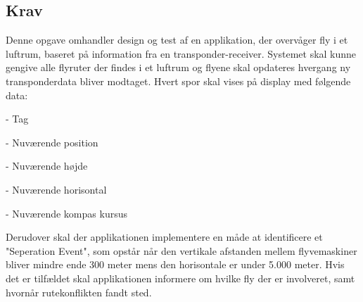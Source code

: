 \subsection{Krav}
Denne opgave omhandler design og test af en applikation, der overvåger fly i et luftrum, baseret på information fra en transponder-receiver. 
Systemet skal kunne gengive alle flyruter der findes i et luftrum og flyene skal opdateres hvergang ny transponderdata bliver modtaget. Hvert spor skal vises på display med følgende data: 

- Tag

- Nuværende position

- Nuværende højde

- Nuværende horisontal

- Nuværende kompas kursus

Derudover skal der applikationen implementere en måde at identificere et "Seperation Event", som opstår når den vertikale afstanden mellem flyvemaskiner bliver mindre ende 300 meter mens den horisontale er under 5.000 meter. 
Hvis det er tilfældet skal applikationen informere om hvilke fly der er involveret, samt hvornår rutekonflikten fandt sted.
